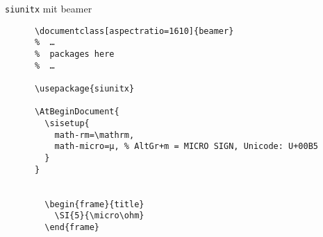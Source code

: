 \begin{frame}[fragile]{\texttt{siunitx} mit beamer}
  \begin{center}
    \begin{lstlisting}
      \documentclass[aspectratio=1610]{beamer}
      %  …
      %  packages here
      %  …

      \usepackage{siunitx}

      \AtBeginDocument{
        \sisetup{
          math-rm=\mathrm,
          math-micro=µ, % AltGr+m = MICRO SIGN, Unicode: U+00B5
        }
      }

      
        \begin{frame}{title}
          \SI{5}{\micro\ohm}
        \end{frame}
      
    \end{lstlisting}
  \end{center}
\end{frame}

